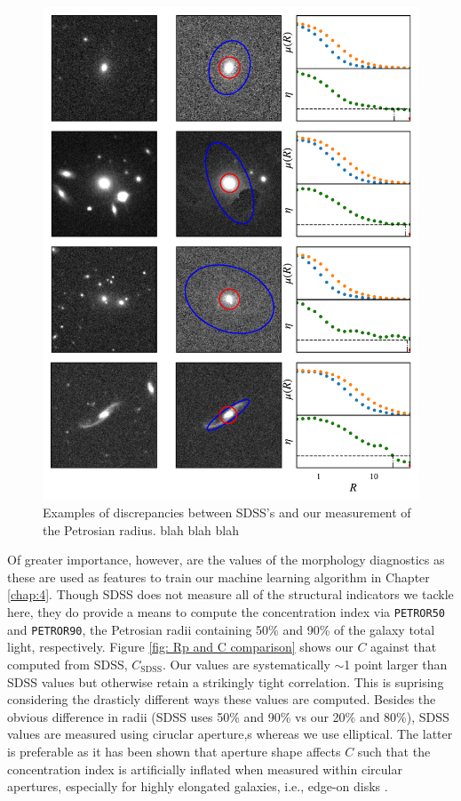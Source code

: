 \begin{figure}
\centering
\includegraphics[width=5in]{Figures/Rp_SBprofiles.pdf}
\caption[Examples of discrepancies between SDSS's and our measurement of the Petrosian radius.]{Examples of discrepancies between SDSS's and our measurement of the Petrosian radius. blah blah blah}
\end{figure}

Of greater importance, however, are the values of the morphology diagnostics as these are used as features to train our machine learning algorithm in Chapter \ref{chap:4}. Though SDSS does not measure all of the structural indicators we tackle here, they do provide a means to compute the concentration index via \texttt{PETROR50} and \texttt{PETROR90}, the Petrosian radii containing 50\% and 90\% of the galaxy total light, respectively. Figure \ref{fig: Rp and C comparison} shows our $C$ against that computed from SDSS, $C_{\mathrm{SDSS}}$. Our values are systematically $\sim$1 point larger than SDSS values but otherwise retain a strikingly tight correlation. This is suprising considering the drasticly different ways these values are computed. Besides the obvious difference in radii (SDSS uses 50\% and 90\% vs our 20\% and 80\%), SDSS values are measured using ciruclar aperture,s whereas we use elliptical. The latter is preferable as it has been shown that aperture shape affects $C$ such that the concentration index is artificially inflated when measured within circular apertures, especially for highly elongated galaxies, i.e., edge-on disks \citep{Bershady2000, Andrae2011}.


